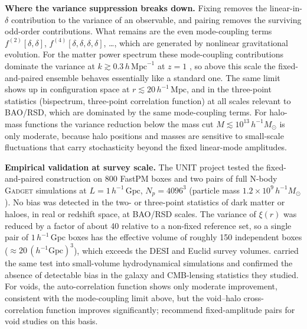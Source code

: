 \documentclass[12pt]{article}
\begin{document}
\begin{tcolorbox}
\textbf{Where the variance suppression breaks down.}
Fixing removes the linear-in-$\delta$ contribution to the variance of an
observable, and pairing removes the surviving odd-order contributions.
What remains are the even mode-coupling terms
$f^{(2)}[\delta,\delta]$, $f^{(4)}[\delta,\delta,\delta,\delta]$, \ldots,
which are generated by nonlinear gravitational evolution.
For the matter power spectrum these mode-coupling contributions dominate
the variance at $k\gtrsim 0.3\,h\,\mathrm{Mpc}^{-1}$ at $z=1$
\citep{Chuang2019}, so above this scale the fixed-and-paired ensemble
behaves essentially like a standard one.
The same limit shows up in configuration space at $r\lesssim
20\,h^{-1}\,\mathrm{Mpc}$, and in the three-point statistics (bispectrum,
three-point correlation function) at all scales relevant to BAO/RSD,
which are dominated by the same mode-coupling terms.
For halo-mass functions the variance reduction below the mass cut
$M\lesssim 10^{13}\,h^{-1}M_\odot$ is only moderate, because halo
positions and masses are sensitive to small-scale fluctuations that
carry stochasticity beyond the fixed linear-mode amplitudes.

\textbf{Empirical validation at survey scale.}
The UNIT project \citep{Chuang2019} tested the fixed-and-paired
construction on 800 FastPM boxes and two pairs of full N-body
\textsc{Gadget} simulations at $L=1\,h^{-1}\,\mathrm{Gpc}$,
$N_p=4096^3$ (particle mass $1.2\times10^9\,h^{-1}M_\odot$).
No bias was detected in the two- or three-point statistics of dark
matter or haloes, in real or redshift space, at BAO/RSD scales.
The variance of $\xi(r)$ was reduced by a factor of about 40 relative
to a non-fixed reference set, so a single pair of $1\,h^{-1}\,\mathrm{Gpc}$
boxes has the effective volume of roughly 150 independent boxes
($\approx 20\,(h^{-1}\mathrm{Gpc})^3$), which exceeds the
DESI and Euclid survey volumes.
\citet{VillaescusaNavarro2018} carried the same test into
small-volume hydrodynamical simulations and confirmed the absence of
detectable bias in the galaxy and CMB-lensing statistics they studied.
For voids, the auto-correlation function shows only moderate improvement,
consistent with the mode-coupling limit above, but the void--halo
cross-correlation function improves significantly; \citet{Chuang2019}
recommend fixed-amplitude pairs for void studies on this basis.


\end{tcolorbox}
\end{document}
